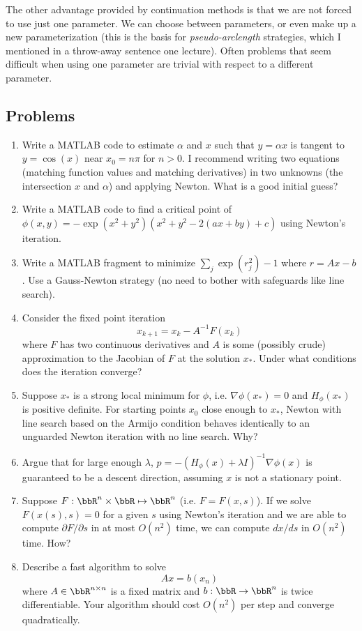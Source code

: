 \documentclass[12pt, leqno]{article}
\begin{document}
The other advantage provided by continuation methods is that we are
not forced to use just one parameter.  We can choose between
parameters, or even make up a new parameterization (this is the basis
for {\em pseudo-arclength} strategies, which I mentioned in a
throw-away sentence one lecture).  Often problems that seem difficult
when using one parameter are trivial with respect to a different
parameter.

\subsection{Problems}

\begin{enumerate}
\item
  Write a MATLAB code to estimate $\alpha$ and $x$ such that
  $y = \alpha x$ is tangent to $y = \cos(x)$ near $x_0 = n \pi$
  for $n > 0$.  I recommend writing two equations (matching function
  values and matching derivatives) in two unknowns (the intersection
  $x$ and $\alpha$) and applying Newton.  What is a good initial guess?
\item
  Write a MATLAB code to find a critical point of
  $\phi(x,y) = -\exp(x^2+y^2) (x^2 + y^2 - 2(ax + by) + c)$
  using Newton's iteration.
\item
  Write a MATLAB fragment to minimize $\sum_j \exp(r_j^2)-1$ where
  $r = Ax-b$.  Use a Gauss-Newton strategy (no need to bother
  with safeguards like line search).
\item
  Consider the fixed point iteration
  \[
    x_{k+1} = x_k - A^{-1} F(x_k)
  \]
  where $F$ has two continuous derivatives and $A$ is some (possibly
  crude) approximation to the Jacobian of $F$ at the solution $x_*$.
  Under what conditions does the iteration converge?
\item
  Suppose $x_*$ is a strong local minimum for $\phi$, i.e. $\nabla
  \phi(x_*) = 0$ and $H_\phi(x_*)$ is positive definite.  For starting
  points $x_0$ close enough to $x_*$, Newton with line search based
  on the Armijo condition behaves identically to an unguarded
  Newton iteration with no line search.  Why?
\item
  Argue that for large enough $\lambda$,
  $p = -(H_{\phi}(x) + \lambda I)^{-1} \nabla \phi(x)$ is guaranteed
  to be a descent direction, assuming $x$ is not a stationary point.
\item
  Suppose $F : \bbR^n \times \bbR \mapsto \bbR^n$ (i.e. $F = F(x,s)$).
  If we solve $F(x(s), s) = 0$ for a given $s$ using Newton's
  iteration and we are able to compute $\partial F/\partial s$
  in at most $O(n^2)$ time, we can compute $dx/ds$ in $O(n^2)$ time.
  How?
\item
  Describe a fast algorithm to solve
  \[
    Ax = b(x_n)
  \]
  where $A \in \bbR^{n \times n}$ is a fixed matrix and
  $b : \bbR \rightarrow \bbR^n$ is twice differentiable.
  Your algorithm should cost $O(n^2)$ per step and converge quadratically.
\end{enumerate}
\end{document}
